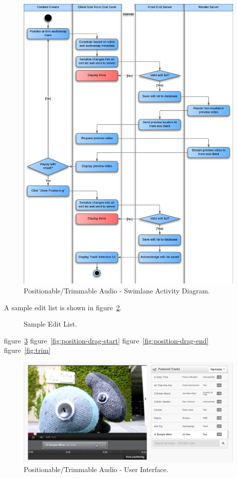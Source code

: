 \documentclass[se,resubmit]{uw-wkrpt}
\begin{document}
\begin{figure}
  \centering
  \includegraphics{swimlane}
  \caption{Positionable/Trimmable Audio - Swimlane Activity Diagram.}
  \label{fig:swimlane}
\end{figure}

A sample edit list is shown in figure~\ref{fig:editlist}.

\begin{figure}
  \centering
  
  \caption{Sample Edit List.}
  \label{fig:editlist}
\end{figure}

figure~\ref{fig:overview}
figure~\ref{fig:position-drag-start}
figure~\ref{fig:position-drag-end}
figure~\ref{fig:trim}

\begin{figure}
  \centering
  \includegraphics[width=5.515in]{overview}
  \caption{Positionable/Trimmable Audio - User Interface.}
  \label{fig:overview}
\end{figure}
\end{document}
